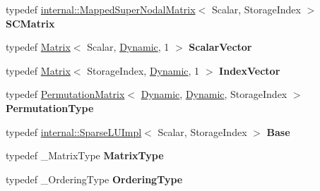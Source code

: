 \begin{DoxyCompactItemize}
\item 
\mbox{\label{group___sparse_l_u___module_a1629a0610cbb03e5a4fa9b508ae4a4b6}} 
typedef \hyperlink{group___sparse_l_u___module_class_eigen_1_1internal_1_1_mapped_super_nodal_matrix}{internal\+::\+Mapped\+Super\+Nodal\+Matrix}$<$ Scalar, Storage\+Index $>$ {\bfseries S\+C\+Matrix}
\item 
\mbox{\label{group___sparse_l_u___module_ac67621b3c8526fc5606a7a708427a959}} 
typedef \hyperlink{group___core___module_class_eigen_1_1_matrix}{Matrix}$<$ Scalar, \hyperlink{namespace_eigen_ad81fa7195215a0ce30017dfac309f0b2}{Dynamic}, 1 $>$ {\bfseries Scalar\+Vector}
\item 
\mbox{\label{group___sparse_l_u___module_a2564483882d758a16067085798d3e8ad}} 
typedef \hyperlink{group___core___module_class_eigen_1_1_matrix}{Matrix}$<$ Storage\+Index, \hyperlink{namespace_eigen_ad81fa7195215a0ce30017dfac309f0b2}{Dynamic}, 1 $>$ {\bfseries Index\+Vector}
\item 
\mbox{\label{group___sparse_l_u___module_a56c15a8364c3dea625d1f1404e7b07d1}} 
typedef \hyperlink{group___core___module_class_eigen_1_1_permutation_matrix}{Permutation\+Matrix}$<$ \hyperlink{namespace_eigen_ad81fa7195215a0ce30017dfac309f0b2}{Dynamic}, \hyperlink{namespace_eigen_ad81fa7195215a0ce30017dfac309f0b2}{Dynamic}, Storage\+Index $>$ {\bfseries Permutation\+Type}
\item 
\mbox{\label{group___sparse_l_u___module_ae4f85e309c65f3f93cbc96a43c39336d}} 
typedef \hyperlink{group___sparse_l_u___module_class_eigen_1_1internal_1_1_sparse_l_u_impl}{internal\+::\+Sparse\+L\+U\+Impl}$<$ Scalar, Storage\+Index $>$ {\bfseries Base}
\item 
\mbox{\label{group___sparse_l_u___module_afde6955eb546fc127e96ad2c1fc087e2}} 
typedef \+\_\+\+Matrix\+Type {\bfseries Matrix\+Type}
\item 
\mbox{\label{group___sparse_l_u___module_a2e2e51e8f3e71a9fec516aaecef7b778}} 
typedef \+\_\+\+Ordering\+Type {\bfseries Ordering\+Type}
\item 

\end{DoxyCompactItemize}
